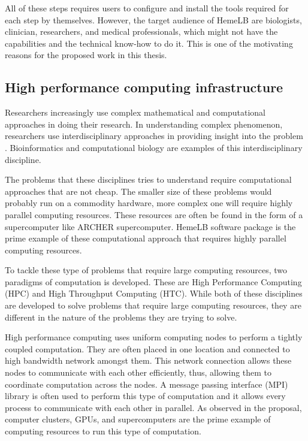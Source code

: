 All of these steps requires users to configure and install the tools required for each step by themselves. However, the target audience of HemeLB are biologists, clinician, researchers, and medical professionals, which might not have the capabilities and the technical know-how to do it. This is one of the motivating reasons for the proposed work in this thesis.


\subsection{High performance computing infrastructure}

Researchers increasingly use complex mathematical and computational approaches in doing their research. In understanding complex phenomenon, researchers use interdisciplinary approaches in providing insight into the problem \citep{huerta2000nih}. Bioinformatics and computational biology are examples of this interdisciplinary discipline. 

The problems that these disciplines tries to understand require computational approaches that are not cheap. The smaller size of these problems would probably run on a commodity hardware, more complex one will require highly parallel computing resources. These resources are often be found in the form of a supercomputer like ARCHER supercomputer. HemeLB software package is the prime example of these computational approach that requires highly parallel computing resources.
 

%

To tackle these type of problems that require large computing resources, two paradigms of computation is developed. These are High Performance Computing (HPC) and High Throughput Computing (HTC).   While both of these disciplines are developed to solve problems that require large computing resources, they are different in the nature of the problems they are trying to solve.

High performance computing uses  uniform  computing nodes to perform a  tightly coupled computation. They are often placed in one location and connected to high bandwidth network amongst them. This network connection allows these nodes to communicate with each other efficiently, thus, allowing them to coordinate computation across the nodes\citep{Micro31:online}. A message passing interface (MPI) library is often used to perform this type of computation and it allows every process to communicate with each other in parallel. As observed in the proposal, computer clusters, GPUs, and supercomputers are the prime example of computing resources to run this type of computation.

